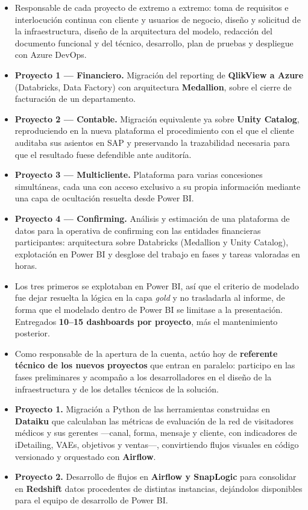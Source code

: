 \documentclass[10pt]{article}
\begin{document}
\begin{itemize}
    \item Responsable de cada proyecto de extremo a extremo: toma de requisitos e interlocución continua con cliente y usuarios de negocio, diseño y solicitud de la infraestructura, diseño de la arquitectura del modelo, redacción del documento funcional y del técnico, desarrollo, plan de pruebas y despliegue con Azure DevOps.
    \item \textbf{Proyecto 1 --- Financiero.} Migración del reporting de \textbf{QlikView a Azure} (Databricks, Data Factory) con arquitectura \textbf{Medallion}, sobre el cierre de facturación de un departamento.
    \item \textbf{Proyecto 2 --- Contable.} Migración equivalente ya sobre \textbf{Unity Catalog}, reproduciendo en la nueva plataforma el procedimiento con el que el cliente auditaba sus asientos en SAP y preservando la trazabilidad necesaria para que el resultado fuese defendible ante auditoría.
    \item \textbf{Proyecto 3 --- Multicliente.} Plataforma para varias concesiones simultáneas, cada una con acceso exclusivo a su propia información mediante una capa de ocultación resuelta desde Power BI.
    \item \textbf{Proyecto 4 --- Confirming.} Análisis y estimación de una plataforma de datos para la operativa de confirming con las entidades financieras participantes: arquitectura sobre Databricks (Medallion y Unity Catalog), explotación en Power BI y desglose del trabajo en fases y tareas valoradas en horas.
    \item Los tres primeros se explotaban en Power BI, así que el criterio de modelado fue dejar resuelta la lógica en la capa \textit{gold} y no trasladarla al informe, de forma que el modelado dentro de Power BI se limitase a la presentación. Entregados \textbf{10--15 dashboards por proyecto}, más el mantenimiento posterior.
    \item Como responsable de la apertura de la cuenta, actúo hoy de \textbf{referente técnico de los nuevos proyectos} que entran en paralelo: participo en las fases preliminares y acompaño a los desarrolladores en el diseño de la infraestructura y de los detalles técnicos de la solución.
\end{itemize}

\begin{itemize}
    \item \textbf{Proyecto 1.} Migración a Python de las herramientas construidas en \textbf{Dataiku} que calculaban las métricas de evaluación de la red de visitadores médicos y sus gerentes —canal, forma, mensaje y cliente, con indicadores de iDetailing, VAEs, objetivos y ventas—, convirtiendo flujos visuales en código versionado y orquestado con \textbf{Airflow}.
    \item \textbf{Proyecto 2.} Desarrollo de flujos en \textbf{Airflow y SnapLogic} para consolidar en \textbf{Redshift} datos procedentes de distintas instancias, dejándolos disponibles para el equipo de desarrollo de Power BI.
\end{itemize}
\end{document}

